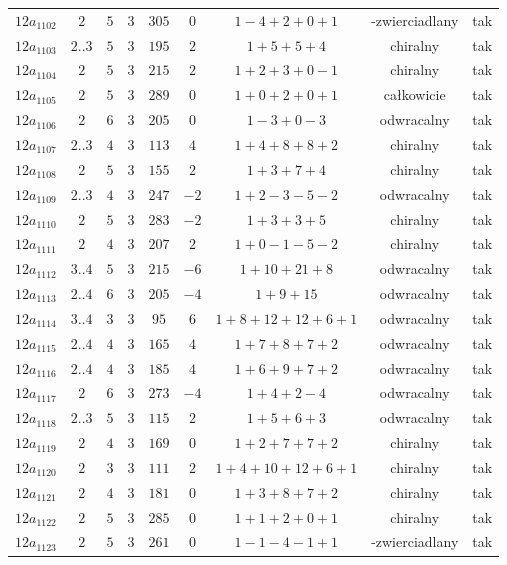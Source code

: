 \begin{longtable}{ccccccccc}
$12a_{1102}$ & $2$ & $5$ & $3$ & $305$ & $0$ & $1-4+2+0+1$ & -zwierciadlany & tak \\
$12a_{1103}$ & $2..3$ & $5$ & $3$ & $195$ & $2$ & $1+5+5+4$ & chiralny & tak \\
$12a_{1104}$ & $2$ & $5$ & $3$ & $215$ & $2$ & $1+2+3+0-1$ & chiralny & tak \\
$12a_{1105}$ & $2$ & $5$ & $3$ & $289$ & $0$ & $1+0+2+0+1$ & całkowicie & tak \\
$12a_{1106}$ & $2$ & $6$ & $3$ & $205$ & $0$ & $1-3+0-3$ & odwracalny & tak \\
$12a_{1107}$ & $2..3$ & $4$ & $3$ & $113$ & $4$ & $1+4+8+8+2$ & chiralny & tak \\
$12a_{1108}$ & $2$ & $5$ & $3$ & $155$ & $2$ & $1+3+7+4$ & chiralny & tak \\
$12a_{1109}$ & $2..3$ & $4$ & $3$ & $247$ & $-2$ & $1+2-3-5-2$ & odwracalny & tak \\
$12a_{1110}$ & $2$ & $5$ & $3$ & $283$ & $-2$ & $1+3+3+5$ & chiralny & tak \\
$12a_{1111}$ & $2$ & $4$ & $3$ & $207$ & $2$ & $1+0-1-5-2$ & chiralny & tak \\
$12a_{1112}$ & $3..4$ & $5$ & $3$ & $215$ & $-6$ & $1+10+21+8$ & odwracalny & tak \\
$12a_{1113}$ & $2..4$ & $6$ & $3$ & $205$ & $-4$ & $1+9+15$ & odwracalny & tak \\
$12a_{1114}$ & $3..4$ & $3$ & $3$ & $95$ & $6$ & $1+8+12+12+6+1$ & odwracalny & tak \\
$12a_{1115}$ & $2..4$ & $4$ & $3$ & $165$ & $4$ & $1+7+8+7+2$ & odwracalny & tak \\
$12a_{1116}$ & $2..4$ & $4$ & $3$ & $185$ & $4$ & $1+6+9+7+2$ & odwracalny & tak \\
$12a_{1117}$ & $2$ & $6$ & $3$ & $273$ & $-4$ & $1+4+2-4$ & odwracalny & tak \\
$12a_{1118}$ & $2..3$ & $5$ & $3$ & $115$ & $2$ & $1+5+6+3$ & odwracalny & tak \\
$12a_{1119}$ & $2$ & $4$ & $3$ & $169$ & $0$ & $1+2+7+7+2$ & chiralny & tak \\
$12a_{1120}$ & $2$ & $3$ & $3$ & $111$ & $2$ & $1+4+10+12+6+1$ & chiralny & tak \\
$12a_{1121}$ & $2$ & $4$ & $3$ & $181$ & $0$ & $1+3+8+7+2$ & chiralny & tak \\
$12a_{1122}$ & $2$ & $5$ & $3$ & $285$ & $0$ & $1+1+2+0+1$ & chiralny & tak \\
$12a_{1123}$ & $2$ & $5$ & $3$ & $261$ & $0$ & $1-1-4-1+1$ & -zwierciadlany & tak \\

\end{longtable}
